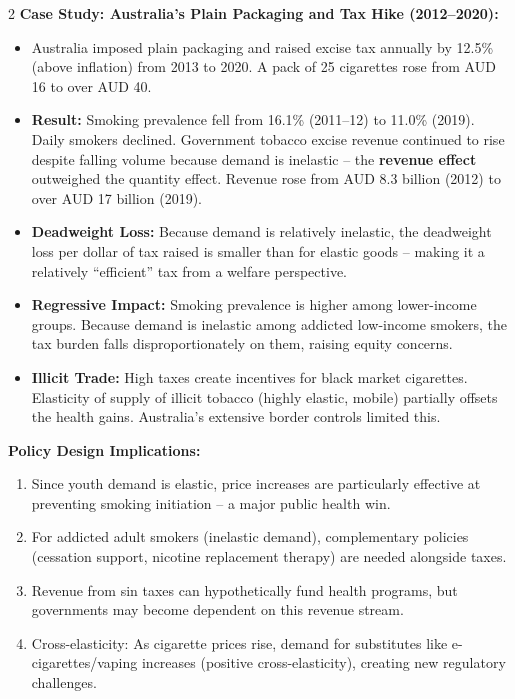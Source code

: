 \documentclass[10pt,a4paper]{article}
\begin{document}
\begin{multicols}{2}
\textbf{Case Study: Australia's Plain Packaging and Tax Hike (2012--2020):}
\begin{itemize}[leftmargin=*,nosep]
    \item Australia imposed plain packaging and raised excise tax annually by 12.5\% (above inflation) from 2013 to 2020. A pack of 25 cigarettes rose from AUD 16 to over AUD 40.
    \item \textbf{Result:} Smoking prevalence fell from 16.1\% (2011--12) to 11.0\% (2019). Daily smokers declined. Government tobacco excise revenue continued to rise despite falling volume because demand is inelastic -- the \textbf{revenue effect} outweighed the quantity effect. Revenue rose from AUD 8.3 billion (2012) to over AUD 17 billion (2019).
    \item \textbf{Deadweight Loss:} Because demand is relatively inelastic, the deadweight loss per dollar of tax raised is smaller than for elastic goods -- making it a relatively ``efficient'' tax from a welfare perspective.
    \item \textbf{Regressive Impact:} Smoking prevalence is higher among lower-income groups. Because demand is inelastic among addicted low-income smokers, the tax burden falls disproportionately on them, raising equity concerns.
    \item \textbf{Illicit Trade:} High taxes create incentives for black market cigarettes. Elasticity of supply of illicit tobacco (highly elastic, mobile) partially offsets the health gains. Australia's extensive border controls limited this.
\end{itemize}

\textbf{Policy Design Implications:}
\begin{enumerate}[leftmargin=*,nosep]
    \item Since youth demand is elastic, price increases are particularly effective at preventing smoking initiation -- a major public health win.
    \item For addicted adult smokers (inelastic demand), complementary policies (cessation support, nicotine replacement therapy) are needed alongside taxes.
    \item Revenue from sin taxes can hypothetically fund health programs, but governments may become dependent on this revenue stream.
    \item Cross-elasticity: As cigarette prices rise, demand for substitutes like e-cigarettes/vaping increases (positive cross-elasticity), creating new regulatory challenges.
\end{enumerate}


\end{multicols}
\end{document}
